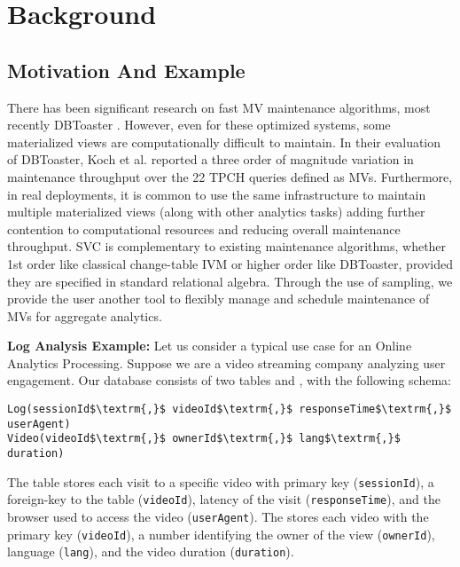 \section{Background}\label{sec-background}

\subsection{Motivation And Example}\label{subsec-inc}
There has been significant research on fast MV maintenance algorithms, most recently DBToaster \cite{DBLP:journals/vldb/KochAKNNLS14}.
However, even for these optimized systems, some materialized views are computationally difficult to maintain.
In their evaluation of DBToaster, Koch et al. \cite{DBLP:journals/vldb/KochAKNNLS14} reported a three order of magnitude variation in maintenance
throughput over the 22 TPCH queries defined as MVs.
Furthermore, in real deployments, it is common to use the same infrastructure to maintain multiple materialized views (along with other analytics tasks) adding further contention to computational resources and reducing overall maintenance throughput.
SVC is complementary to existing maintenance algorithms, whether 1st order like classical change-table IVM or higher order like DBToaster, provided they are specified in standard relational algebra.
Through the use of sampling, we provide the user another tool to flexibly manage and schedule maintenance of MVs for aggregate analytics.

\vspace{0.25em}

\noindent \textbf{Log Analysis Example: } Let us consider a typical use case for an Online Analytics Processing.
Suppose we are a video streaming company analyzing user engagement.
Our database consists of two tables  and , with the following schema:
\begin{lstlisting}[mathescape,basicstyle={\scriptsize}]
Log(sessionId$\textrm{,}$ videoId$\textrm{,}$ responseTime$\textrm{,}$ userAgent)
Video(videoId$\textrm{,}$ ownerId$\textrm{,}$ lang$\textrm{,}$ duration)
\end{lstlisting}
The  table stores each visit to a specific video with primary key (\texttt{sessionId}), a foreign-key to the  table (\texttt{videoId}), latency of the visit (\texttt{responseTime}), and the browser used to access the video (\texttt{userAgent}).
The  stores each video with the primary key (\texttt{videoId}), a number identifying the owner of the view (\texttt{ownerId}), language (\texttt{lang}), and the video duration (\texttt{duration}).

